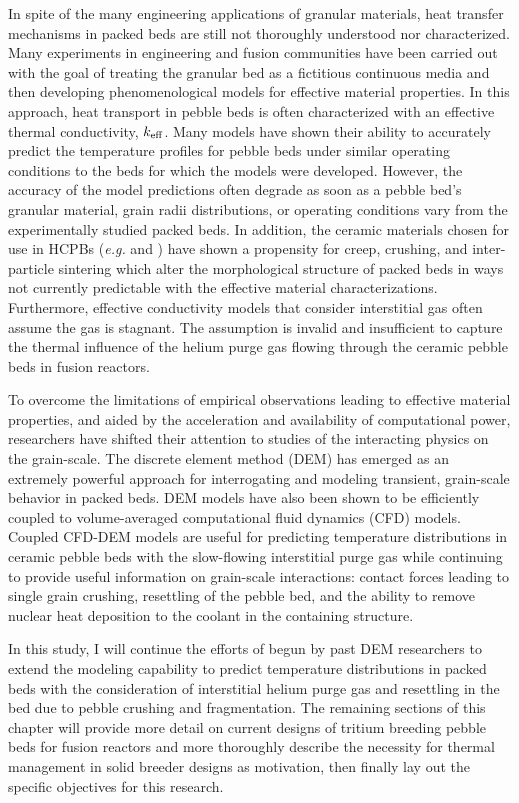 In spite of the many engineering applications of granular materials, heat transfer mechanisms in packed beds are still not thoroughly understood nor characterized. Many experiments in engineering and fusion communities have been carried out with the goal of treating the granular bed as a fictitious continuous media and then developing phenomenological models for effective material properties. In this approach, heat transport in pebble beds is often characterized with an effective thermal conductivity, $k_\text{eff}$. Many models have shown their ability to accurately predict the temperature profiles for pebble beds under similar operating conditions to the beds for which the models were developed. However, the accuracy of the model predictions often degrade as soon as a pebble bed's granular material, grain radii distributions, or operating conditions vary from the experimentally studied packed beds. In addition, the ceramic materials chosen for use in HCPBs (\textit{e.g.} \lit and \lis) have shown a propensity for creep, crushing, and inter-particle sintering which alter the morphological structure of packed beds in ways not currently predictable with the effective material characterizations. Furthermore, effective conductivity models that consider interstitial gas often assume the gas is stagnant. The assumption is invalid and insufficient to capture the thermal influence of the helium purge gas flowing through the ceramic pebble beds in fusion reactors.

To overcome the limitations of empirical observations leading to effective material properties, and aided by the acceleration and availability of computational power, researchers have shifted their attention to studies of the interacting physics on the grain-scale. The discrete element method (DEM) has emerged as an extremely powerful approach for interrogating and modeling transient, grain-scale behavior in packed beds. DEM models have also been shown to be efficiently coupled to volume-averaged computational fluid dynamics (CFD) models. Coupled CFD-DEM models are useful for predicting temperature distributions in ceramic pebble beds with the slow-flowing interstitial purge gas while continuing to provide useful information on grain-scale interactions: contact forces leading to single grain crushing, resettling of the pebble bed, and the ability to remove nuclear heat deposition to the coolant in the containing structure.

In this study, I will continue the efforts of begun by past DEM researchers to extend the modeling capability to predict temperature distributions in packed beds with the consideration of interstitial helium purge gas and resettling in the bed due to pebble crushing and fragmentation. The remaining sections of this chapter will provide more detail on current designs of tritium breeding pebble beds for fusion reactors and more thoroughly describe the necessity for thermal management in solid breeder designs as motivation, then finally lay out the specific objectives for this research.


